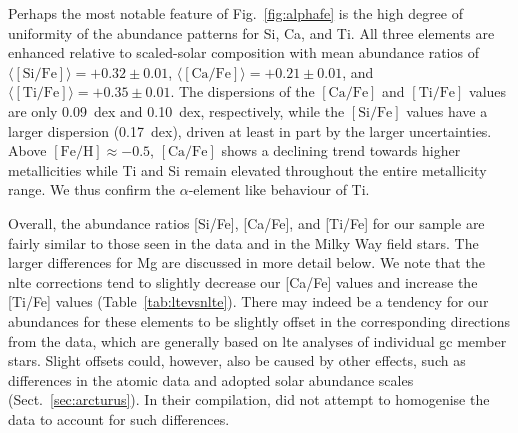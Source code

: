 \documentclass{aa}
\begin{document}
Perhaps the most notable feature of Fig.~\ref{fig:alphafe} is the high degree of uniformity of the abundance patterns for Si, Ca, and Ti. All three elements are enhanced relative to scaled-solar composition with mean abundance ratios of $\langle \mathrm{[Si/Fe]}\rangle = +0.32\pm0.01$, 
$\langle \mathrm{[Ca/Fe]}\rangle = +0.21\pm0.01$, and
$\langle \mathrm{[Ti/Fe]}\rangle = +0.35\pm0.01$. The dispersions of the $\mathrm{[Ca/Fe]}$ and $\mathrm{[Ti/Fe]}$ values are only 0.09~dex and 0.10~dex, respectively, while the $\mathrm{[Si/Fe]}$ values have a larger dispersion (0.17~dex), driven at least in part by the larger uncertainties. Above $\mathrm{[Fe/H]}\approx-0.5$, $\mathrm{[Ca/Fe]}$ shows a declining trend towards higher metallicities while Ti and Si remain elevated throughout the entire metallicity range. We thus confirm the $\alpha$-element like behaviour of Ti. 

Overall, the abundance ratios [Si/Fe], [Ca/Fe], and [Ti/Fe] for our sample are fairly similar to those
seen in the  data and in the Milky Way field stars. The larger differences for Mg are discussed in more detail below. We note that the \ac{nlte} corrections tend to slightly decrease our [Ca/Fe] values and increase the [Ti/Fe] values (Table~\ref{tab:ltevsnlte}). There may indeed be a tendency for our abundances for these elements to be slightly offset in the corresponding directions from the  data, which are generally based on \ac{lte} analyses of individual \ac{gc} member stars.  Slight offsets could, however, also be caused by other effects, such as differences in the atomic data and adopted solar abundance scales (Sect.~\ref{sec:arcturus}). In their compilation,  did not attempt to homogenise the data to account for such differences. 
\end{document}

